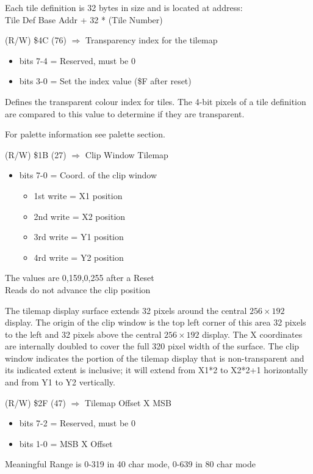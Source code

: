 Each tile definition is 32 bytes in size and is located at address:\\
Tile Def Base Addr + 32 * (Tile Number)

(R/W) \$4C (76) $\Rightarrow$ Transparency index for the tilemap
\begin{itemize}
\item[] bits 7-4 = Reserved, must be 0
\item[] bits 3-0 = Set the index value (\$F after reset)
\end{itemize}

Defines the transparent colour index for tiles. The 4-bit pixels of a
tile definition are compared to this value to determine if they are
transparent.

For palette information see palette section.

(R/W) \$1B (27) $\Rightarrow$ Clip Window Tilemap
\begin{itemize}
\item[] bits 7-0 = Coord. of the clip window
  \begin{itemize}
  \item[] 1st write = X1 position
  \item[] 2nd write = X2 position
  \item[] 3rd write = Y1 position
  \item[] 4rd write = Y2 position
  \end{itemize}
\end{itemize}
The values are 0,159,0,255 after a Reset\\
Reads do not advance the clip position

The tilemap display surface extends 32 pixels around the central
$256\times192$ display. The origin of the clip window is the top left
corner of this area 32 pixels to the left and 32 pixels above the
central $256\times192$ display. The X coordinates are internally
doubled to cover the full 320 pixel width of the surface. The clip
window indicates the portion of the tilemap display that is
non-transparent and its indicated extent is inclusive; it will extend
from X1*2 to X2*2+1 horizontally and from Y1 to Y2 vertically.

(R/W) \$2F (47) $\Rightarrow$ Tilemap Offset X MSB
\begin{itemize}
\item[] bits 7-2 = Reserved, must be 0
\item[] bits 1-0 = MSB X Offset
\end{itemize}
Meaningful Range is 0-319 in 40 char mode, 0-639 in 80 char mode

